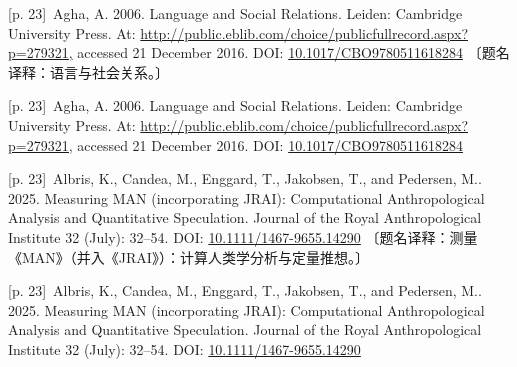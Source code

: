 \documentclass[10pt,a4paper]{article}
\begin{document}
\noindent\begin{minipage}{\textwidth}\begin{minipage}[t]{\dimexpr.5\textwidth-4mm\relax}\noindent\begin{minipage}[t]{\linewidth}{\scriptsize\color{gray} [p. 23]}\ Agha, A. 2006. Language and Social Relations. Leiden: Cambridge University Press. At: \url{http://public.eblib.com/choice/publicfullrecord.aspx?p=279321,} accessed 21 December 2016. DOI: \url{10.1017/CBO9780511618284} 〔题名译释：语言与社会关系。〕\par\end{minipage}\par\end{minipage}\hfill\begin{minipage}[t]{\dimexpr.5\textwidth-4mm\relax}\noindent\begin{minipage}[t]{\linewidth}{\scriptsize\color{gray} [p. 23]}\ Agha, A. 2006. Language and Social Relations. Leiden: Cambridge University Press. At: \url{http://public.eblib.com/choice/publicfullrecord.aspx?p=279321,} accessed 21 December 2016. DOI: \url{10.1017/CBO9780511618284}\par\end{minipage}\par\end{minipage}\end{minipage}\par
\noindent\begin{minipage}{\textwidth}\begin{minipage}[t]{\dimexpr.5\textwidth-4mm\relax}\noindent\begin{minipage}[t]{\linewidth}{\scriptsize\color{gray} [p. 23]}\ Albris, K., Candea, M., Enggard, T., Jakobsen, T., and Pedersen, M.. 2025. Measuring MAN (incorporating JRAI): Computational Anthropological Analysis and Quantitative Speculation. Journal of the Royal Anthropological Institute 32 (July): 32–54. DOI: \url{10.1111/1467-9655.14290} 〔题名译释：测量《MAN》（并入《JRAI》）：计算人类学分析与定量推想。〕\par\end{minipage}\par\end{minipage}\hfill\begin{minipage}[t]{\dimexpr.5\textwidth-4mm\relax}\noindent\begin{minipage}[t]{\linewidth}{\scriptsize\color{gray} [p. 23]}\ Albris, K., Candea, M., Enggard, T., Jakobsen, T., and Pedersen, M.. 2025. Measuring MAN (incorporating JRAI): Computational Anthropological Analysis and Quantitative Speculation. Journal of the Royal Anthropological Institute 32 (July): 32–54. DOI: \url{10.1111/1467-9655.14290}\par\end{minipage}\par\end{minipage}\end{minipage}\par
\end{document}

